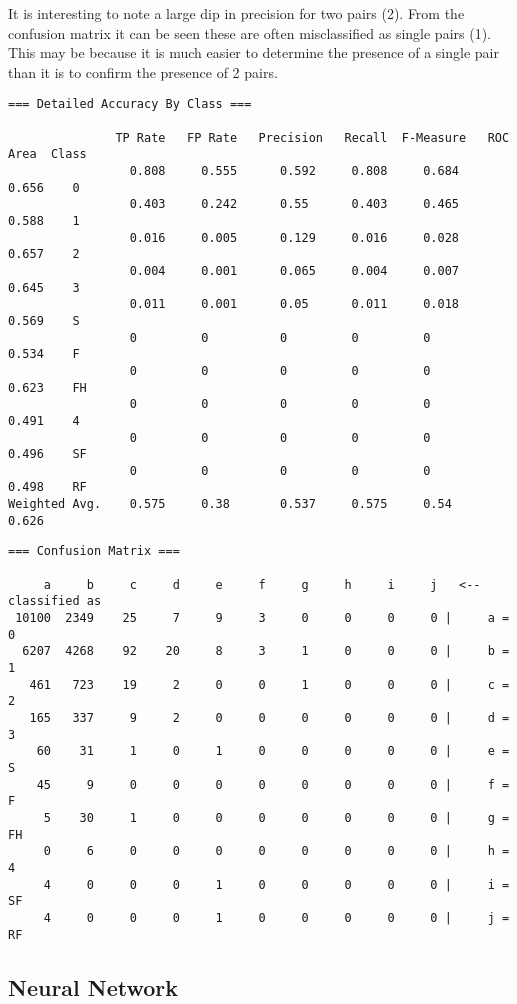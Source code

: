 \documentclass[11pt, a4paper]{article}
\begin{document}
It is interesting to note a large dip in precision for two pairs (2). From the confusion matrix it can be seen these are often misclassified as single pairs (1). This may be because it is much easier to determine the presence of a single pair than it is to confirm the presence of 2 pairs.

\begin{verbatim}
=== Detailed Accuracy By Class ===

               TP Rate   FP Rate   Precision   Recall  F-Measure   ROC Area  Class
                 0.808     0.555      0.592     0.808     0.684      0.656    0
                 0.403     0.242      0.55      0.403     0.465      0.588    1
                 0.016     0.005      0.129     0.016     0.028      0.657    2
                 0.004     0.001      0.065     0.004     0.007      0.645    3
                 0.011     0.001      0.05      0.011     0.018      0.569    S
                 0         0          0         0         0          0.534    F
                 0         0          0         0         0          0.623    FH
                 0         0          0         0         0          0.491    4
                 0         0          0         0         0          0.496    SF
                 0         0          0         0         0          0.498    RF
Weighted Avg.    0.575     0.38       0.537     0.575     0.54       0.626
\end{verbatim}

\begin{verbatim}
=== Confusion Matrix ===

     a     b     c     d     e     f     g     h     i     j   <-- classified as
 10100  2349    25     7     9     3     0     0     0     0 |     a = 0
  6207  4268    92    20     8     3     1     0     0     0 |     b = 1
   461   723    19     2     0     0     1     0     0     0 |     c = 2
   165   337     9     2     0     0     0     0     0     0 |     d = 3
    60    31     1     0     1     0     0     0     0     0 |     e = S
    45     9     0     0     0     0     0     0     0     0 |     f = F
     5    30     1     0     0     0     0     0     0     0 |     g = FH
     0     6     0     0     0     0     0     0     0     0 |     h = 4
     4     0     0     0     1     0     0     0     0     0 |     i = SF
     4     0     0     0     1     0     0     0     0     0 |     j = RF
\end{verbatim}

\subsection*{Neural Network}
\end{document}
